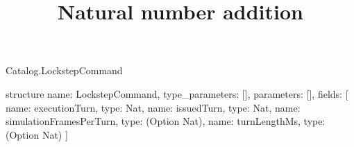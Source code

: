 \begin{lexlean}{Catalog.LockstepCommand}
\title{Natural number addition}
\begin{semanticmodule}
structure{
  name: LockstepCommand,
  type_parameters: [],
  parameters: [],
  fields: [
    {name: executionTurn, type: Nat},
    {name: issuedTurn, type: Nat},
    {name: simulationFramesPerTurn, type: (Option Nat)},
    {name: turnLengthMs, type: (Option Nat)}
  ]
}
\end{semanticmodule}
\end{lexlean}
